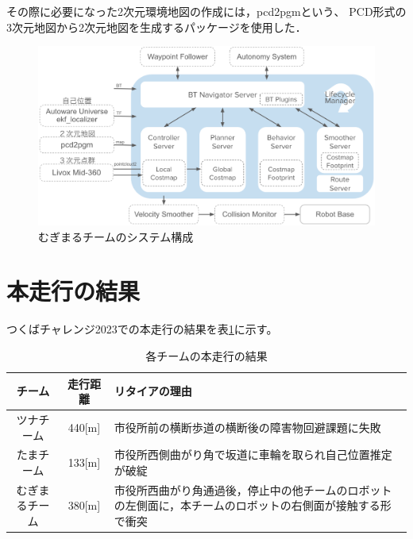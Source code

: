 \documentclass[twocolumn,9pt]{jsproceedings}
\begin{document}
その際に必要になった2次元環境地図の作成には，pcd2pgmという、
PCD形式の3次元地図から2次元地図を生成するパッケージを使用した．

\begin{figure}[h]
  \begin{center}
    \includegraphics[width=1.0\linewidth]{figs/mugimaru_system.pdf}
    \caption{むぎまるチームのシステム構成}
    \label{fig:mugimaru_system}
  \end{center}
\end{figure}



\section{本走行の結果}

つくばチャレンジ2023での本走行の結果を表\ref{MainRun}に示す。

\begin{table}[H]
  \caption{各チームの本走行の結果}
  \label{MainRun}
  \begin{tabular}{|c|c|p{4.0cm}|}
    \hline
    チーム         & 走行距離 & リタイアの理由                                                                                             \\
    \hline
    ツナチーム     & 440[m]   & 市役所前の横断歩道の横断後の障害物回避課題に失敗                                                           \\
    \hline
    たまチーム     & 133[m]   & 市役所西側曲がり角で坂道に車輪を取られ自己位置推定が破綻                                                   \\
    \hline
    むぎまるチーム & 380[m]    & 市役所西曲がり角通過後，停止中の他チームのロボットの左側面に，本チームのロボットの右側面が接触する形で衝突 \\
    \hline
  \end{tabular}
\end{table}
\end{document}
